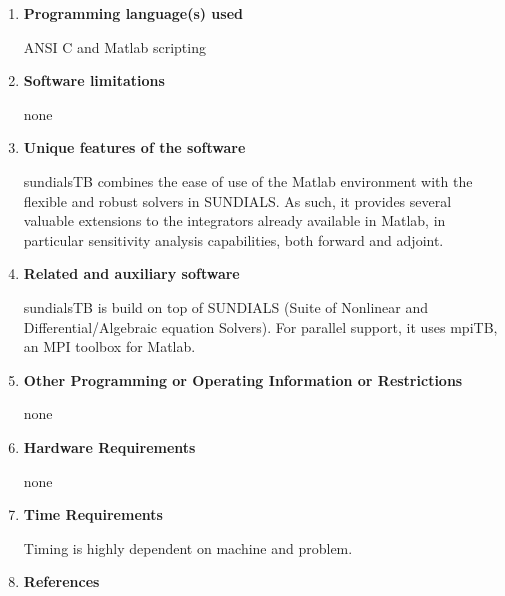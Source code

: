 \documentclass[12pt]{letter}
\begin{document}
\begin{letter}
\begin{enumerate}
\item {\bf Programming language(s) used}

ANSI C and Matlab scripting

\item {\bf Software limitations}

none

\item {\bf Unique features of the software}

sundialsTB combines the ease of use of the Matlab environment with the flexible
and robust solvers in SUNDIALS. As such, it provides several valuable extensions
to the integrators already available in Matlab, in particular sensitivity analysis
capabilities, both forward and adjoint.


\item {\bf Related and auxiliary software}

sundialsTB is build on top of SUNDIALS (Suite of Nonlinear and Differential/Algebraic 
equation Solvers). For parallel support, it uses mpiTB, an MPI toolbox for Matlab.

\item {\bf Other Programming or Operating Information or Restrictions}

none


\item {\bf Hardware Requirements}

none


\item {\bf Time Requirements}

Timing is highly dependent on machine and problem.


\item {\bf References}


\end{enumerate}
\end{letter}
\end{document}
